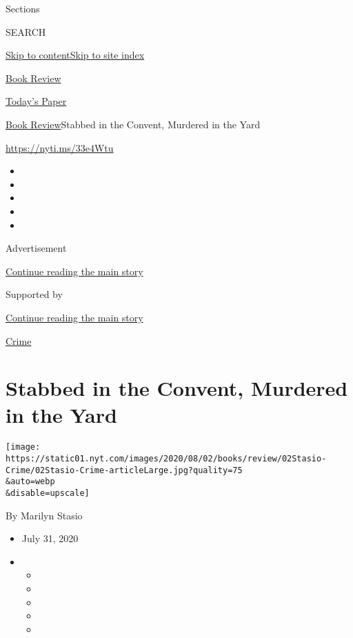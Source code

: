 Sections

SEARCH

\protect\hyperlink{site-content}{Skip to
content}\protect\hyperlink{site-index}{Skip to site index}

\href{https://www.nytimes.com/section/books/review}{Book Review}

\href{https://myaccount.nytimes.com/auth/login?response_type=cookie\&client_id=vi}{}

\href{https://www.nytimes.com/section/todayspaper}{Today's Paper}

\href{/section/books/review}{Book Review}\textbar{}Stabbed in the
Convent, Murdered in the Yard

\url{https://nyti.ms/33e4Wtu}

\begin{itemize}
\item
\item
\item
\item
\item
\end{itemize}

Advertisement

\protect\hyperlink{after-top}{Continue reading the main story}

Supported by

\protect\hyperlink{after-sponsor}{Continue reading the main story}

\href{/column/crime}{Crime}

\hypertarget{stabbed-in-the-convent-murdered-in-the-yard}{%
\section{Stabbed in the Convent, Murdered in the
Yard}\label{stabbed-in-the-convent-murdered-in-the-yard}}

\texttt{[image: https://static01.nyt.com/images/2020/08/02/books/review/02Stasio-Crime/02Stasio-Crime-articleLarge.jpg?quality=75\\\&auto=webp\\\&disable=upscale]}

By Marilyn Stasio

\begin{itemize}
\item
  July 31, 2020
\item
  \begin{itemize}
  \item
  \item
  \item
  \item
  \item
  \end{itemize}
\end{itemize}

